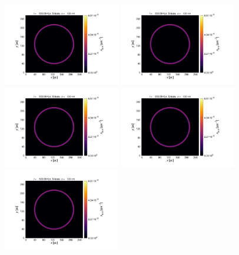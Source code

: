 \documentclass[fleqn,usenatbib]{mnras}
\begin{document}
\begin{figure}
   \includegraphics[trim=2.8cm 1.5cm 9.3cm 2.0cm, clip=true,page=1,height = 3.6cm]{Pics/Pics_A2/Density_1_02001.pdf}\hspace*{-0.05cm}
   \includegraphics[trim=2.8cm 1.5cm 9.3cm 2.0cm, clip=true,page=2,height = 3.6cm]{Pics/Pics_A2/Density_1_02001.pdf}\hspace*{-0.05cm}
   \includegraphics[trim=2.8cm 1.5cm 9.3cm 2.0cm, clip=true,page=3,height = 3.6cm]{Pics/Pics_A2/Density_1_02001.pdf}\hspace*{-0.05cm}
   \includegraphics[trim=5.2cm 1.5cm 3.2cm 2.0cm, clip=true,page=4,height = 3.6cm]{Pics/Pics_A2/Density_1_02001.pdf}\hspace*{-0.05cm}
   \includegraphics[trim=2.8cm 1.5cm 9.3cm 2.0cm, clip=true,page=4,height = 3.6cm]{Pics/Pics_A2/Density_1_02001.pdf}\\

\end{figure}
\end{document}
